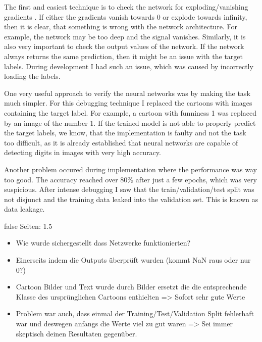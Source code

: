 \documentclass[draft,final,oneside]{vutinfth} %
\begin{document}
The first and easiest technique is to check the network for exploding/vanishing gradients \cite{vanishinggradient}. If either the gradients vanish towards 0 or explode towards infinity, then it is clear, that something is wrong with the network architecture. For example, the network may be too deep and the signal vanishes. Similarly, it is also very important to check the output values of the network. If the network always returns the same prediction, then it might be an issue with the target labels. During development I had such an issue, which was caused by incorrectly loading the labels.

One very useful approach to verify the neural networks was by making the task much simpler. For this debugging technique I replaced the cartoons with images containing the target label. For example, a cartoon with funniness 1 was replaced by an image of the number 1. If the trained model is not able to properly predict the target labels, we know, that the implementation is faulty and not the task too difficult, as it is already established that neural networks are capable of detecting digits in images with very high accuracy.

Another problem occured during implementation where the performance was way too good. The accuracy reached over 80\% after just a few epochs, which was very suspicious. After intense debugging I saw that the train/validation/test split was not disjunct and the training data leaked into the validation set. This is known as data leakage.

\if false
Seiten: 1.5

\begin{itemize}
\item Wie wurde sichergestellt dass Netzwerke funktionierten? 
\item Einerseits indem die Outputs überprüft wurden (kommt NaN raus oder nur 0?)
\item Cartoon Bilder und Text wurde durch Bilder ersetzt die die entsprechende Klasse des ursprünglichen Cartoons enthielten => Sofort sehr gute Werte
\item Problem war auch, dass einmal der Training/Test/Validation Split fehlerhaft war und deswegen anfangs die Werte viel zu gut waren => Sei immer skeptisch deinen Resultaten gegenüber.
\end{itemize}
\fi
\end{document}
